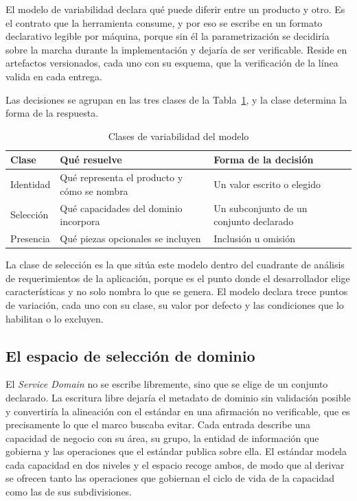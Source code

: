 El modelo de variabilidad declara qué puede diferir entre un producto y otro.
Es el contrato que la herramienta consume, y por eso se escribe en un formato
declarativo legible por máquina, porque sin él la parametrización se decidiría
sobre la marcha durante la implementación y dejaría de ser verificable.
Reside en artefactos versionados, cada uno con su esquema, que la
verificación de la línea valida en cada entrega.

Las decisiones se agrupan en las tres clases de la
Tabla~\ref{tab:clases-variabilidad}, y la clase determina la forma de la
respuesta.

\begin{table}[H]
\centering
\begin{tabular}{p{2.6cm}p{5.4cm}p{6.6cm}}
\toprule
\textbf{Clase} & \textbf{Qué resuelve} & \textbf{Forma de la decisión} \\
\midrule
Identidad & Qué representa el producto y cómo se nombra & Un valor escrito o elegido \\
Selección & Qué capacidades del dominio incorpora & Un subconjunto de un conjunto declarado \\
Presencia & Qué piezas opcionales se incluyen & Inclusión u omisión \\
\bottomrule
\end{tabular}
\caption{Clases de variabilidad del modelo}
\label{tab:clases-variabilidad}
\end{table}

La clase de selección es la que sitúa este modelo dentro del cuadrante de
análisis de requerimientos de la aplicación, porque es el punto donde el
desarrollador elige características y no solo nombra lo que se genera. El
modelo declara trece puntos de variación, cada uno con su clase, su valor por
defecto y las condiciones que lo habilitan o lo excluyen.

\subsection{El espacio de selección de dominio}

El \emph{Service Domain} no se escribe libremente, sino que se elige de un
conjunto declarado. La escritura libre dejaría el metadato de dominio sin
validación posible y convertiría la alineación con el estándar en una
afirmación no verificable, que es precisamente lo que el marco buscaba
evitar. Cada entrada describe una capacidad de negocio con su área, su grupo,
la entidad de información que gobierna y las operaciones que el estándar
publica sobre ella. El estándar modela cada capacidad en dos niveles y el
espacio recoge ambos, de modo que al derivar se ofrecen tanto las operaciones
que gobiernan el ciclo de vida de la capacidad como las de sus subdivisiones.

